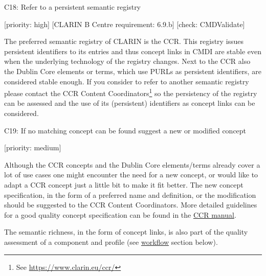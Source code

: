 C18: Refer to a persistent semantic registry

{[}priority: high{]} {[}CLARIN B Centre requirement: 6.9.b{]} {[}check:
CMDValidate{]}

The preferred semantic registry of CLARIN is the CCR. This registry
issues persistent identifiers to its entries and thus concept links in
CMDI are stable even when the underlying technology of the registry
changes. Next to the CCR also the Dublin Core elements or terms, which
use PURLs as persistent identifiers, are considered stable enough. If
you consider to refer to another semantic registry please contact the
CCR Content Coordinators\footnote{See \url{https://www.clarin.eu/ccr/}}
so the persistency of the registry can be assessed and the use of its
(persistent) identifiers as concept links can be considered.

C19: If no matching concept can be found suggest a new or modified
concept

{[}priority: medium{]}

Although the CCR concepts and the Dublin Core elements/terms already
cover a lot of use cases one might encounter the need for a new concept,
or would like to adapt a CCR concept just a little bit to make it fit
better. The new concept specification, in the form of a preferred name
and definition, or the modification should be suggested to the CCR
Content Coordinators. More detailed guidelines for a good quality
concept specification can be found in the
\href{https://www.overleaf.com/read/pxnsftbcphhb}{CCR manual}.

The semantic richness, in the form of concept links, is also part of the
quality assessment of a component and profile (see
\href{/modelling_component_metadata/workflow.md}{workflow} section
below).
